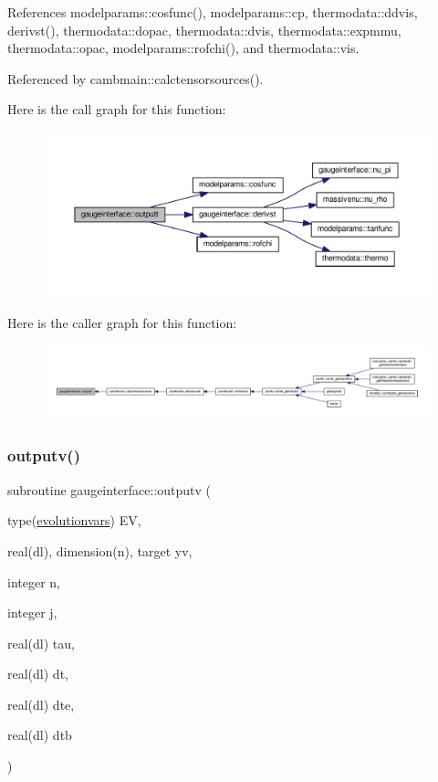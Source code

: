 References modelparams\+::cosfunc(), modelparams\+::cp, thermodata\+::ddvis, derivst(), thermodata\+::dopac, thermodata\+::dvis, thermodata\+::expmmu, thermodata\+::opac, modelparams\+::rofchi(), and thermodata\+::vis.



Referenced by cambmain\+::calctensorsources().

Here is the call graph for this function\+:
\nopagebreak
\begin{figure}[H]
\begin{center}
\leavevmode
\includegraphics[width=350pt]{namespacegaugeinterface_a5235d59ec77fa4b3a41d9754c8e447ca_cgraph}
\end{center}
\end{figure}
Here is the caller graph for this function\+:
\nopagebreak
\begin{figure}[H]
\begin{center}
\leavevmode
\includegraphics[width=350pt]{namespacegaugeinterface_a5235d59ec77fa4b3a41d9754c8e447ca_icgraph}
\end{center}
\end{figure}
\mbox{\label{namespacegaugeinterface_ad9126befa5df67da981345f6230fede4}} 
\subsubsection{\texorpdfstring{outputv()}{outputv()}}
{\footnotesize\ttfamily subroutine gaugeinterface\+::outputv (\begin{DoxyParamCaption}\item[{type(\mbox{\hyperlink{structgaugeinterface_1_1evolutionvars}{evolutionvars}})}]{EV,  }\item[{real(dl), dimension(n), target}]{yv,  }\item[{integer}]{n,  }\item[{integer}]{j,  }\item[{real(dl)}]{tau,  }\item[{real(dl)}]{dt,  }\item[{real(dl)}]{dte,  }\item[{real(dl)}]{dtb }\end{DoxyParamCaption})}



